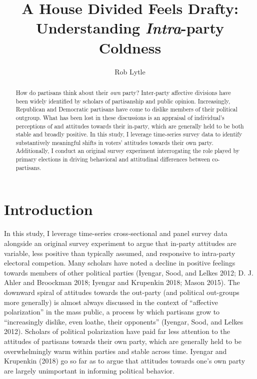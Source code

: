 \documentclass[
]{article}
\title{A House Divided Feels Drafty: Understanding \emph{Intra}-party Coldness}
\author{Rob Lytle}
\date{}
\begin{document}
\maketitle
\begin{abstract}
How do partisans think about their \emph{own} party? Inter-party affective divisions have been widely identified by scholars of partisanship and public opinion. Increasingly, Republican and Democratic partisans have come to dislike members of their political outgroup. What has been lost in these discussions is an appraisal of individual's perceptions of and attitudes towards their in-party, which are generally held to be both stable and broadly positive. In this study, I leverage time-series survey data to identify substantively meaningful shifts in voters' attitudes towards their own party. Additionally, I conduct an original survey experiment interrogating the role played by primary elections in driving behavioral and attitudinal differences between co-partisans.
\end{abstract}

{
\setcounter{tocdepth}{2}
\tableofcontents
}
\doublespacing

\hypertarget{introduction}{%
\section{Introduction}\label{introduction}}

In this study, I leverage time-series cross-sectional and panel survey data alongside an original survey experiment to argue that in-party attitudes are variable, less positive than typically assumed, and responsive to intra-party electoral competion. Many scholars have noted a decline in positive feelings towards members of other political parties (Iyengar, Sood, and Lelkes 2012; D. J. Ahler and Broockman 2018; Iyengar and Krupenkin 2018; Mason 2015). The downward spiral of attitudes towards the out-party (and political out-groups more generally) is almost always discussed in the context of ``affective polarization'' in the mass public, a process by which partisans grow to ``increasingly dislike, even loathe, their opponents'' (Iyengar, Sood, and Lelkes 2012). Scholars of political polarization have paid far less attention to the attitudes of partisans towards their own party, which are generally held to be overwhelmingly warm within parties and stable across time. Iyengar and Krupenkin (2018) go so far as to argue that attitudes towards one's own party are largely unimportant in informing political behavior.
\end{document}

